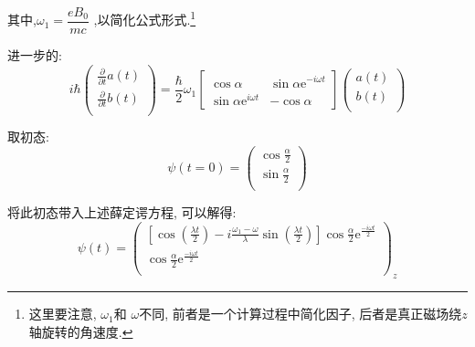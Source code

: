 \documentclass[a4paper, 11pt]{article}
\begin{document}
\begin{spacing}{1.2}
        其中,$\omega_1 = \dfrac{eB_0}{mc}$ ,以简化公式形式.\footnote{这里要注意, $\omega_1$和
        $\omega$不同, 前者是一个计算过程中简化因子, 后者是真正磁场绕$z$轴旋转的角速度.}

        进一步的:
        \begin{equation}
          i\hbar{}
          \left(
            \begin{array}{c}
              \frac{\partial}{\partial{}t}a(t)\\
              \frac{\partial}{\partial{}t}b(t)\\
            \end{array} \right)
          = 
          \dfrac{\hbar}{2}\omega_1
          \begin{bmatrix}
            \cos\alpha & \sin\alpha\mathrm{e}^{-i\omega{}t} \\
            \sin\alpha\mathrm{e}^{i\omega{}t} & -\cos\alpha
          \end{bmatrix}
          \left(
            \begin{array}{c}
              a(t)\\
              b(t)\\
            \end{array} \right)
        \end{equation}

        取初态:
        \begin{equation}
          \psi(t=0) = \left(
            \begin{array}{c}
              \cos\frac{\alpha}{2}\\
              \sin\frac{\alpha}{2}\\
            \end{array} \right)
        \end{equation}

        将此初态带入上述薛定谔方程, 可以解得:
        \begin{equation}
          \psi(t) = \left(
            \begin{array}{c}
              [\cos(\frac{\lambda{}t}{2})-i\frac{\omega_1-\omega}{\lambda}
              \sin(\frac{\lambda{}t}{2})]\cos\frac{\alpha}{2}
              \mathrm{e}^\frac{-i\omega{}t}{2} \\
              
              [\cos(\frac{\lambda{}t}{2})-i\frac{\omega_1-\omega}{\lambda}
              \sin(\frac{\lambda{}t}{2})]\cos\frac{\alpha}{2}
              \mathrm{e}^\frac{-i\omega{}t}{2} \\
            \end{array} \right)_z
        \end{equation}


\end{spacing}
\end{document}
